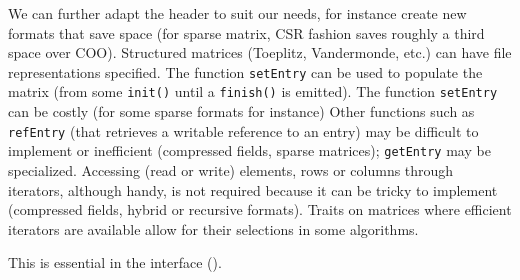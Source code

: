 		We can further adapt the header to suit our needs, for instance
		create new formats that save space (for sparse matrix, CSR fashion saves
		roughly a third space over COO). Structured
		matrices
(Toeplitz, Vandermonde, etc.)
can have file representations specified.
%
		The function \texttt{setEntry} can be
		used to populate the matrix (from some \texttt{init()} until a
		\texttt{finish()} is emitted).  The function \texttt{setEntry}
		can be costly (for some sparse formats for instance)
%
		Other functions such as {\tt refEntry} (that retrieves a
		writable reference to an entry) may be difficult to implement
		or inefficient (compressed fields, sparse matrices);
		\texttt{getEntry} may be specialized.
		Accessing (read or write) elements, rows or columns through
		iterators, although handy, is not required because it can be
		tricky to implement (compressed fields, hybrid or
		recursive formats). Traits on matrices where efficient iterators
		are available allow for their selections in some algorithms.
		\begin{comment}
		(\danger We cannot have {\tt const} iterators for all formats
		(see hybrid), walking through a matrix in unspecified order can
		be problematic, for instance, in an hom when a zero may
		alter/change the representation. I don't understand hom more
		than I understand init/rebind by the way, and I won't
		understand it until the morphism is given/chooseable/enforced.
		Rebind is really hom, so why is it in the interface anyway?
		This is the same with getEntry. We don't require it because we
		have a solution. Also, if apply is to be implemented via a
		domain or {\tt mul}, we could stress it is in the interface for
		convenience when writing code only. End of \danger)
		\end{comment}
%
		This is essential in the \applin interface ().
